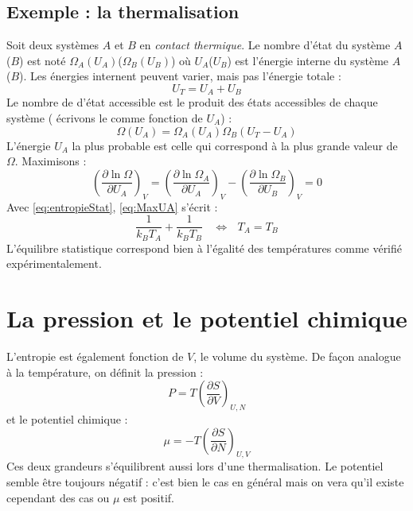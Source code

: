 \documentclass	[11pt, a4paper, openany]{book}
\begin{document}
	\subsection*{Exemple : la thermalisation}
	Soit deux systèmes $A$ et $B$ en \textit{contact thermique}. Le nombre d'état du système
	$A$ ($B$) est noté $\Omega_A(U_A)$($\Omega_B(U_B)$) où $U_A$($U_B$) est l'énergie interne
	du système $A$ ($B$). Les énergies internent peuvent varier, mais pas l'énergie totale :
	\begin{equation}
	U_T = U_A+U_B
	\end{equation}
	Le nombre de d'état accessible est le produit des états accessibles de chaque système (
	écrivons le comme fonction de $U_A$) :
	\begin{equation}
	\Omega(U_A) = \Omega_A(U_A)\Omega_B(U_T-U_A)
	\end{equation}
	L'énergie $U_A$ la plus probable est celle qui correspond à la plus grande valeur de $
	\Omega$. Maximisons :
	\begin{equation}
	\left(\dfrac{\partial \ln\Omega}{\partial U_A}\right)_V =	\left(\dfrac{\partial \ln\Omega_A}
	{\partial U_A}\right)_V - 	\left(\dfrac{\partial \ln\Omega_B}{\partial U_B}\right)_V = 0
	\label{eq:MaxUA}
	\end{equation}
	Avec \autoref{eq:entropieStat}, \autoref{eq:MaxUA} s'écrit :
	\begin{equation}
	\frac{1}{k_BT_A} + \frac{1}{k_BT_B}\ \ \ \ \Leftrightarrow\ \ \ T_A = T_B
	\end{equation}
	L'équilibre statistique correspond bien à l'égalité des températures comme vérifié
	expérimentalement.
	

\section{La pression et le potentiel chimique}
L'entropie est également fonction de $V$, le volume du système. De façon analogue à la 
température, on définit la pression :
\begin{equation}
P = T\left(\dfrac{\partial S}{\partial V}\right)_{U,N}
\end{equation}
et le potentiel chimique :
\begin{equation}
\mu = -T\left(\dfrac{\partial S}{\partial N}\right)_{U,V}
\end{equation}
Ces deux grandeurs s'équilibrent aussi lors d'une thermalisation. Le potentiel semble être 
toujours négatif : c'est bien le cas en général mais on vera qu'il existe cependant des 
cas ou $\mu$ est positif.
\end{document}
